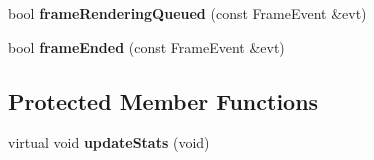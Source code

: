 \begin{DoxyCompactItemize}
\item 
\hypertarget{class_example_frame_listener_a4794892d63b2454aec729504c93c2b78}{
bool {\bfseries frameRenderingQueued} (const FrameEvent \&evt)}
\label{class_example_frame_listener_a4794892d63b2454aec729504c93c2b78}

\item 
\hypertarget{class_example_frame_listener_a4806a1941ac4edacc2ce19dbe20f1a82}{
bool {\bfseries frameEnded} (const FrameEvent \&evt)}
\label{class_example_frame_listener_a4806a1941ac4edacc2ce19dbe20f1a82}

\end{DoxyCompactItemize}
\subsection*{Protected Member Functions}
\begin{DoxyCompactItemize}
\item 
\hypertarget{class_example_frame_listener_a7b491e56aaf065033ba1d9ede8e3b70e}{
virtual void {\bfseries updateStats} (void)}
\label{class_example_frame_listener_a7b491e56aaf065033ba1d9ede8e3b70e}

\end{DoxyCompactItemize}
